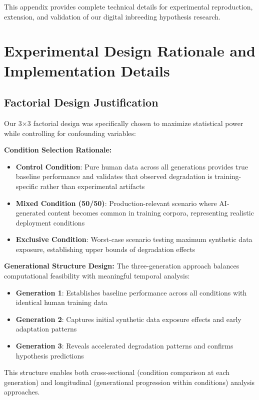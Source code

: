 \documentclass{article}
\begin{document}
This appendix provides complete technical details for experimental reproduction, extension, and validation of our digital inbreeding hypothesis research.

\section{Experimental Design Rationale and Implementation Details}
\label{appendix:experimental_design}

\subsection{Factorial Design Justification}

Our 3×3 factorial design was specifically chosen to maximize statistical power while controlling for confounding variables:

\textbf{Condition Selection Rationale:}
\begin{itemize}
    \item \textbf{Control Condition}: Pure human data across all generations provides true baseline performance and validates that observed degradation is training-specific rather than experimental artifacts
    \item \textbf{Mixed Condition (50/50)}: Production-relevant scenario where AI-generated content becomes common in training corpora, representing realistic deployment conditions
    \item \textbf{Exclusive Condition}: Worst-case scenario testing maximum synthetic data exposure, establishing upper bounds of degradation effects
\end{itemize}

\textbf{Generational Structure Design:}
The three-generation approach balances computational feasibility with meaningful temporal analysis:
\begin{itemize}
    \item \textbf{Generation 1}: Establishes baseline performance across all conditions with identical human training data
    \item \textbf{Generation 2}: Captures initial synthetic data exposure effects and early adaptation patterns
    \item \textbf{Generation 3}: Reveals accelerated degradation patterns and confirms hypothesis predictions
\end{itemize}

This structure enables both cross-sectional (condition comparison at each generation) and longitudinal (generational progression within conditions) analysis approaches.
\end{document}
